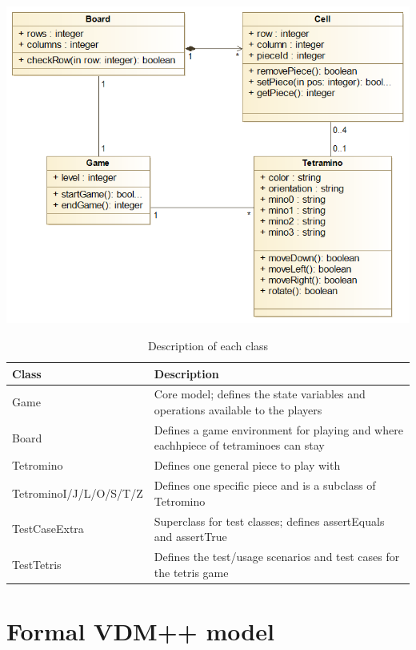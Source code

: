 \documentclass[a4paper]{article}
\begin{document}
\begin{center}
	\includegraphics[scale=0.4]{resources/img/uml}
	\label{uml}
\end{center}

\begin{table}[!h]
	\centering
	\label{description-classes}
	\begin{tabular}{|l|p{10cm}|}
	\hline
	\textbf{Class} 			   & \textbf{Description}	\\	\hline
	Game		   			   &	Core model; defines the state variables and operations available to the players	\\	\hline
	Board		   			   &	Defines a game environment for playing and where eachhpiece of tetraminoes can stay \\	\hline
	Tetromino	   			   &	Defines one general piece to play with	\\	\hline
	TetrominoI/J/L/O/S/T/Z	   &	Defines one specific piece and is a subclass of Tetromino \\	\hline
	TestCaseExtra  			   &	Superclass for test classes; defines assertEquals and assertTrue	\\	\hline
	TestTetris	   			   &	Defines the test/usage scenarios and test cases for the tetris game	\\	\hline
	\end{tabular}
	\caption{Description of each class}
\end{table}

\section{Formal VDM++ model}
\end{document}

